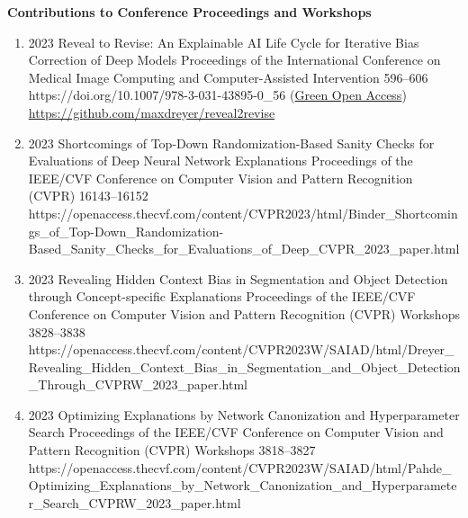 \headedsection %
{\bf Contributions to Conference Proceedings and Workshops}{}
{
    \begin{enumerate}
        
        \item {}
                            {2023}
                            {Reveal to Revise: An Explainable AI Life Cycle for Iterative Bias Correction of Deep Models}
                            {Proceedings of the International Conference on Medical Image Computing and Computer-Assisted Intervention}
                            {596--606}
                            {https://doi.org/10.1007/978-3-031-43895-0_56}
                            {(\href{https://arxiv.org/abs/2303.12641}{Green Open Access})\\ \href{https://github.com/maxdreyer/reveal2revise}{https://github.com/maxdreyer/reveal2revise}}


        \item {}
                            {2023}
                            {Shortcomings of Top-Down Randomization-Based Sanity Checks for Evaluations of Deep Neural Network Explanations}
                            {Proceedings of the IEEE/CVF Conference on Computer Vision and Pattern Recognition (CVPR)}
                            {16143--16152}
                            {https://openaccess.thecvf.com/content/CVPR2023/html/Binder_Shortcomings_of_Top-Down_Randomization-Based_Sanity_Checks_for_Evaluations_of_Deep_CVPR_2023_paper.html}

        \item {}
                            {2023}
                            {Revealing Hidden Context Bias in Segmentation and Object Detection through Concept-specific Explanations}
                            {Proceedings of the IEEE/CVF Conference on Computer Vision and Pattern Recognition (CVPR) Workshops}
                            {3828--3838}
                            {https://openaccess.thecvf.com/content/CVPR2023W/SAIAD/html/Dreyer_Revealing_Hidden_Context_Bias_in_Segmentation_and_Object_Detection_Through_CVPRW_2023_paper.html}

        \item {}
                            {2023}
                            {Optimizing Explanations by Network Canonization and Hyperparameter Search}
                            {Proceedings of the IEEE/CVF Conference on Computer Vision and Pattern Recognition (CVPR) Workshops}
                            {3818--3827}
                            {https://openaccess.thecvf.com/content/CVPR2023W/SAIAD/html/Pahde_Optimizing_Explanations_by_Network_Canonization_and_Hyperparameter_Search_CVPRW_2023_paper.html} 
                            


\end{enumerate}}
